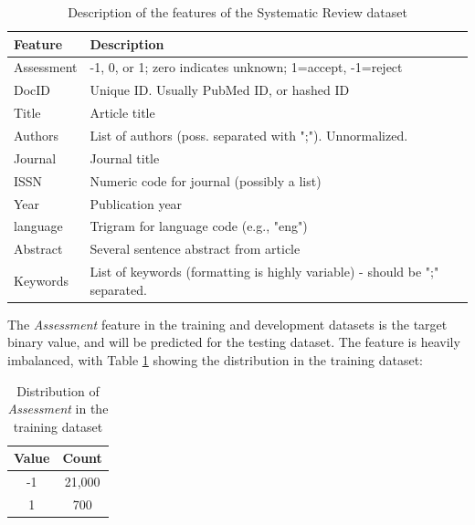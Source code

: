 \documentclass[11pt]{article}
\begin{document}
\begin{table}[!ht]
    \caption{Description of the features of the Systematic Review dataset}
    \begin{center}

        \begin{tabular}{| l | l |}
        \hline
        \textbf{Feature} & \textbf{Description}
        \\ \hline
        Assessment & -1, 0, or 1; zero indicates unknown; 1=accept, -1=reject
        \\ \hline
        DocID & Unique ID. Usually PubMed ID, or hashed ID
        \\ \hline
        Title & Article title
        \\ \hline
        Authors & List of authors (poss. separated with ";"). Unnormalized.
        \\ \hline
        Journal & Journal title
        \\ \hline
        ISSN & Numeric code for journal (possibly a list)
        \\ \hline
        Year & Publication year
        \\ \hline
        language & Trigram for language code (e.g., "eng")
        \\ \hline
        Abstract & Several sentence abstract from article
        \\ \hline
        Keywords & List of keywords (formatting is highly variable) - should be ";" separated.
        \\ \hline
        \end{tabular}

    \end{center}

\end{table}

The \textit{Assessment} feature in the training and development datasets is the target binary value, and will be predicted for the testing dataset. The feature is heavily imbalanced, with Table \ref{table:dist_train} showing the distribution in the training dataset:

\begin{table}[!ht]
    \caption{Distribution of \textit{Assessment} in the training dataset}
    \label{table:dist_train}
    \begin{center}

        \begin{tabular}{| c | c |}
        \hline
        \textbf{Value} & \textbf{Count}
        \\ \hline
        -1 & 21,000
        \\ \hline
        1 & 700
        \\ \hline
        \end{tabular}

    \end{center}

\end{table}
\end{document}
